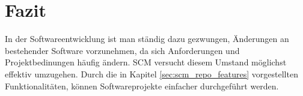 \documentclass[runningheads,a4paper]{uwsese}
\begin{document}
\section{Fazit}
In der Softwareentwicklung ist man ständig dazu gezwungen, Änderungen an
bestehender Software vorzunehmen, da sich Anforderungen
und Projektbedinungen häufig ändern. SCM versucht diesem Umstand möglichst
effektiv umzugehen. Durch die in Kapitel \ref{sec:scm_repo_features} vorgestellten
Funktionalitäten, können Softwareprojekte einfacher durchgeführt werden.



\end{document}
